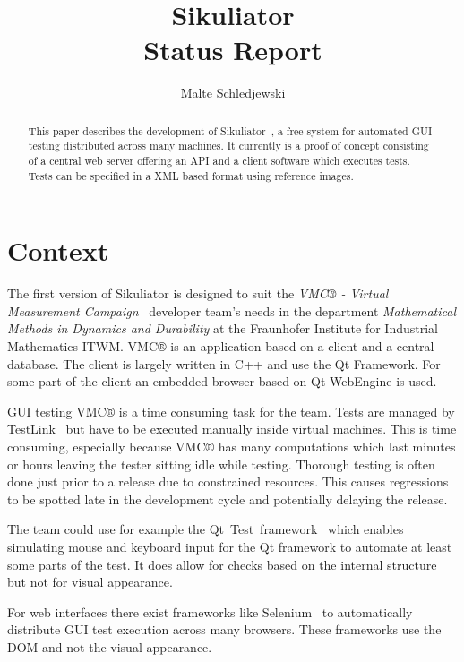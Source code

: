 \documentclass[a4paper,twocolumn,twoside]{article}
\title{Sikuliator\\ 
	\large Status Report}
\author{Malte Schledjewski}
\newcommand{\VMC}[0]{VMC®}
\newcommand{\Sik}[0]{Sikuliator}
\begin{document}


\maketitle
\begin{abstract}
	This paper describes the development of \Sik{}~\cite{Sikuliator}, 
	a free system for automated GUI testing distributed across many machines.
	It currently is a proof of concept consisting of a central web server offering an API and 
	a client software which executes tests.
	Tests can be specified in a XML based format using reference images.
\end{abstract}

\tableofcontents

\section{Context}

The first version of \Sik{} is designed to suit the 
\emph{\VMC{} - Virtual Measurement Campaign}~\cite{VMConline} developer team's needs in the
department \emph{Mathematical Methods in Dynamics and Durability} 
at the Fraunhofer Institute for Industrial Mathematics ITWM.
\VMC{} is an application based on a client and a central database.
The client is largely written in C++ and use the Qt Framework.
For some part of the client an embedded browser based on Qt WebEngine is used.

GUI testing \VMC{} is a time consuming task for the team.
Tests are managed by TestLink~\cite{TestLink} but have to be executed manually inside virtual machines.
This is time consuming, especially because \VMC{} has many computations which last minutes or hours 
leaving the tester sitting idle while testing. 
Thorough testing is often done just prior to a release due to constrained resources.
This causes regressions to be spotted late in the development cycle and potentially delaying the release. 

The team could use for example the Qt~Test~framework~\cite{QtTest} which enables simulating mouse and keyboard input for the Qt framework to automate at least some parts of the test.
It does allow for checks based on the internal structure but not for visual appearance.

For web interfaces there exist frameworks like Selenium~\cite{Selenium} to automatically distribute GUI test execution across many browsers.
These frameworks use the DOM and not the visual appearance.
\end{document}
